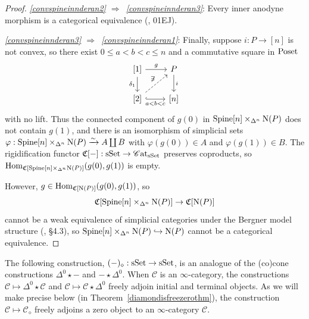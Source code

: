 \documentclass{tac}
\newcommand{\f}[1]{\mathfrak{#1}}
\newcommand{\s}[1]{\mathscr{#1}}
\newcommand{\tx}[1]{\textnormal{#1}}
\newcommand{\cat}{\s{C}\tx{at}}
\begin{document}
\begin{proof}
\emph{\ref{convspineinnderan2} $\Rightarrow$~\ref{convspineinnderan3}}: Every inner anodyne morphism is a categorical equivalence (\cite{kerodon}, 01EJ).

\hfill

\emph{\ref{convspineinnderan3} $\Rightarrow$~\ref{convspineinnderan1}}: Finally, suppose $i : P\to [n]$ is not convex, so there exist $0\leq a < b <c \leq n$ and a commutative square in $\tx{Poset}$
\[\begin{tikzcd}
{[1]} \arrow[]{r}{g} \arrow[]{d}[swap]{\delta_1} & P \arrow[]{d}{i} \\
{[2]} \arrow[dashed]{ur}{\not\exists} \arrow[hook]{r}[swap]{a<b<c} & {[n]}
\end{tikzcd}\]
with no lift.  Thus the connected component of $g(0)$ in $\tx{Spine}[n] \times_{\Delta^n} \tx{N}(P) $ does not contain $g(1)$, and there is an isomorphism of simplicial sets $\varphi : \tx{Spine}[n] \times_{\Delta^n} \tx{N}(P) \xrightarrow{\sim} A \coprod B$ with $\varphi (g(0))\in A$ and $\varphi (g(1)) \in B$.  The rigidification functor $\f{C}[ - ] : \tx{sSet} \to \cat_{\tx{sSet}}$ preserves coproducts, so $\tx{Hom}_{\f{C}[\tx{Spine}[n] \times_{\Delta^n} \tx{N}(P) ]} (g(0),g(1))$ is empty.

However, $g \in \tx{Hom}_{\f{C}[\tx{N}(P)]} (g(0), g(1))$, so 
\[ \f{C}[\tx{Spine}[n] \times_{\Delta^n} \tx{N}(P) ] \to  \f{C}[\tx{N}(P)] \]
cannot be a weak equivalence of simplicial categories under the Bergner model structure (\cite{bergner}, \S 4.3), so $\tx{Spine}[n] \times_{\Delta^n} \tx{N}(P) \hookrightarrow \tx{N}(P)$ cannot be a categorical equivalence.
\end{proof}

The following construction, $(-)_\diamond : \tx{sSet} \to \tx{sSet}$, is an analogue of the (co)cone constructions $\Delta^0 \star -$ and $-\star \Delta^0$.  When $\s{C}$ is an $\infty$-category, the constructions $\s{C} \mapsto \Delta^0 \star \s{C}$ and $\s{C}\mapsto \s{C} \star \Delta^0 $ freely adjoin initial and terminal objects.  As we will make precise below (in Theorem~\ref{diamondisfreezerothm}), the construction $\s{C} \mapsto \s{C}_\diamond$ freely adjoins a zero object to an $\infty$-category $\s{C}$.
\end{document}

